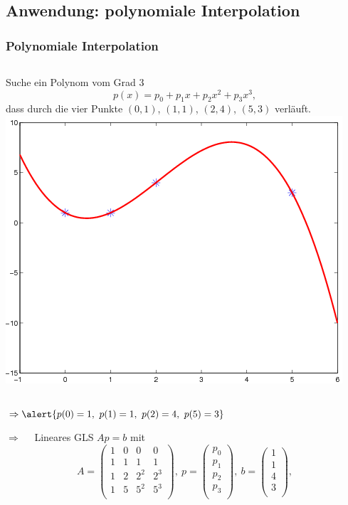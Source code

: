 \subsection{Anwendung: polynomiale Interpolation}
% 
% 
\begin{frame}[fragile]\frametitle{Polynomiale Interpolation}
\begin{columns}[b]
Suche ein Polynom vom Grad 3
\[ p(x)= p_0 +p_1 x +p_2 x^2 +p_3 x^3,  \]
 dass durch die vier Punkte
$(0,1)$, $(1,1)$, $(2,4)$, $(5,3)$
verläuft.
\includegraphics[width=\textwidth]{./figures/grafik_6}
\end{columns}
$\Rightarrow  \alert{ p(0)=1, \ p(1)=1, \ p(2)=4, \ p(5)=3}$

$\Rightarrow \quad$ Lineares GLS \alert{ $Ap=b$} mit
{\scriptsize \[ A= \left( \begin{array}{cccc}
1 & 0 & 0 & 0\\
1 & 1 & 1 & 1\\
1 & 2 & 2^2 & 2^3 \\
1 & 5 & 5^2 & 5^3 \\
\end{array} \right), \
p=\left( \begin{array}{c} 
p_0 \\ p_1 \\ p_2 \\p_3\\
\end{array} \right),
\
b=\left( \begin{array}{c} 
1 \\ 1 \\ 4 \\ 3\\
\end{array} \right),
\]}  
\end{frame}
